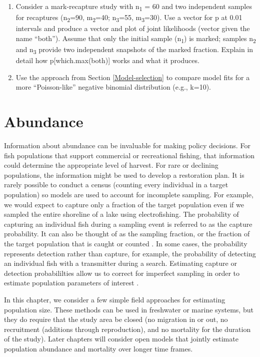 \documentclass[
]{krantz}
\begin{document}
\begin{enumerate}
\def\labelenumi{\arabic{enumi}.}
\setcounter{enumi}{3}
\item
  Consider a mark-recapture study with n\textsubscript{1} = 60 and two independent samples for recaptures (n\textsubscript{2}=90, m\textsubscript{2}=40; n\textsubscript{3}=55, m\textsubscript{3}=30). Use a vector for p at 0.01 intervals and produce a vector and plot of joint likelihoods (vector given the name ``both''). Assume that only the initial sample (n\textsubscript{1}) is marked; samples n\textsubscript{2} and n\textsubscript{3} provide two independent snapshots of the marked fraction. Explain in detail how p{[}which.max(both){]} works and what it produces.
\item
  Use the approach from Section \ref{Model-selection} to compare model fits for a more ``Poisson-like'' negative binomial distribution (e.g., k=10).
\end{enumerate}

\hypertarget{Abundance}{%
\chapter{Abundance}\label{Abundance}}

Information about abundance can be invaluable for making policy decisions. For fish populations that support commercial or recreational fishing, that information could determine the appropriate level of harvest. For rare or declining populations, the information might be used to develop a restoration plan. It is rarely possible to conduct a census (counting every individual in a target population) so models are used to account for incomplete sampling. For example, we would expect to capture only a fraction of the target population even if we sampled the entire shoreline of a lake using electrofishing. The probability of capturing an individual fish during a sampling event is referred to as the capture probability. It can also be thought of as the sampling fraction, or the fraction of the target population that is caught or counted \citep{williams.etal_2002}. In some cases, the probability represents detection rather than capture, for example, the probability of detecting an individual fish with a transmitter during a search. Estimating capture or detection probabililties allow us to correct for imperfect sampling in order to estimate population parameters of interest \citep{williams.etal_2002}.

In this chapter, we consider a few simple field approaches for estimating population size. These methods can be used in freshwater or marine systems, but they do require that the study area be closed (no migration in or out, no recruitment (additions through reproduction), and no mortality for the duration of the study). Later chapters will consider open models that jointly estimate population abundance and mortality over longer time frames.
\end{document}
